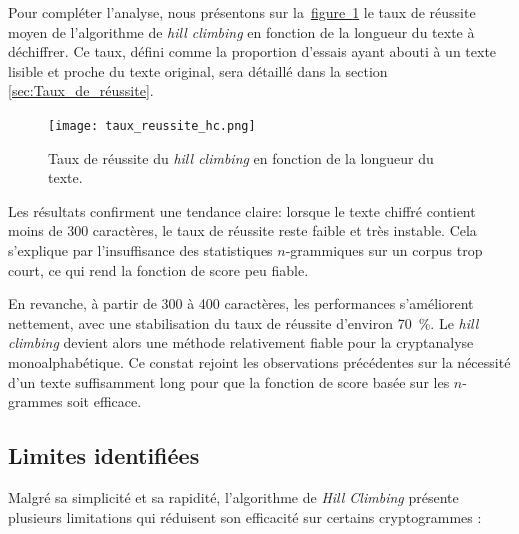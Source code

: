 \documentclass[a4paper]{article}
\newcommand{\figref}[1]{\hyperref[#1]{figure~\ref*{#1}}}
\begin{document}
Pour compléter l’analyse, nous présentons sur la~\figref{fig:taux_reussite} le taux de réussite moyen de l’algorithme de \textit{hill climbing} en fonction de la longueur du texte à déchiffrer. Ce taux, défini comme la proportion d’essais ayant abouti à un texte lisible et proche du texte original, sera détaillé dans la section \ref{sec:Taux_de_réussite}.

\begin{figure}[H]
\centering
\texttt{[image: taux\_reussite\_hc.png]}
\caption{Taux de réussite du \textit{hill climbing} en fonction de la longueur du texte.}
\label{fig:taux_reussite}
\end{figure}


Les résultats confirment une tendance claire: lorsque le texte chiffré contient moins de 300 caractères, le taux de réussite reste faible et très instable. Cela s'explique par l’insuffisance des statistiques $n$-grammiques sur un corpus trop court, ce qui rend la fonction de score peu fiable.

En revanche, à partir de 300 à 400 caractères, les performances s'améliorent nettement, avec une stabilisation du taux de réussite d'environ 70~\%. Le \textit{hill climbing} devient alors une méthode relativement fiable pour la cryptanalyse monoalphabétique. Ce constat rejoint les observations précédentes sur la nécessité d’un texte suffisamment long pour que la fonction de score basée sur les $n$-grammes soit efficace.



\subsection{Limites identifiées}

Malgré sa simplicité et sa rapidité, l’algorithme de \textit{Hill Climbing} présente plusieurs limitations qui réduisent son efficacité sur certains cryptogrammes :
\end{document}
